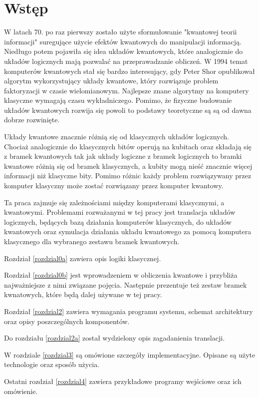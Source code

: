 \chapter{Wstęp}
\thispagestyle{chapterBeginStyle}

W latach 70. po raz pierwszy zostało użyte sformułowanie "kwantowej teorii informacji" suregujące użycie efektów kwantowych do manipulacji informacją. Niedługo potem pojawiła się idea układów kwantowych, które analogicznie do układów logicznych mają pozwalać na przeprawadzanie obliczeń. W 1994 temat komputerów kwantowych stał się bardzo interesujący, gdy Peter Shor opublikował algorytm wykorzystujący układy kwantowe, który rozwiązuje problem faktoryzacji w czasie wielomianowym. Najlepsze znane algorytmy na komputery klasyczne wymagają czasu wykładniczego. Pomimo, że fizyczne budowanie układów kwantowych rozwija się powoli to podstawy teoretyczne są są od dawna dobrze rozwinięte.

Układy kwantowe znacznie różnią się od klasycznych układów logicznych. Chociaż analogicznie do klasycznych bitów operują na kubitach oraz składają się z bramek kwantowych tak jak układy logiczne z bramek logicznych to bramki kwantowe różnią się od bramek klasycznych, a kubity mogą nieść znacznie więcej informacji niż klasyczne bity. Pomimo różnic każdy problem rozwiązywany przez komputer klasyczny może zostać rozwiązany przez komputer kwantowy.

Ta praca zajmuje się zależnościami między komputerami klasycznymi, a kwantowymi. Problemami rozważanymi w tej pracy jest translacja układów logicznych, będących bazą działania komputerów klasycznych, do układów kwantowych oraz symulacja działania układu kwantowego za pomocą komputera klasycznego dla wybranego zestawu bramek kwantowych. 

Rozdział \ref{rozdzial0a} zawiera opis logiki klasycznej.

Rozdział \ref{rozdzial0b} jest wprowadzeniem w obliczenia kwantowe i przybliża najważniejsze z nimi związane pojęcia. Następnie prezentuje też zestaw bramek kwnatowych, które będą dalej używane w tej pracy.

Rozdział \ref{rozdzial2} zawiera wymagania programu systemu, schemat architektury oraz opisy poszczególnych komponentów.

Do rozdziału \ref{rozdzial2a} został wydzielony opis zagadanienia translacji.

W rozdziale \ref{rozdzial3} są omówione szczegóły implementacyjne. Opisane są użyte technologie oraz sposób użycia.

Ostatni rozdział \ref{rozdzial4} zawiera przykładowe programy wejściowe oraz ich omówienie.